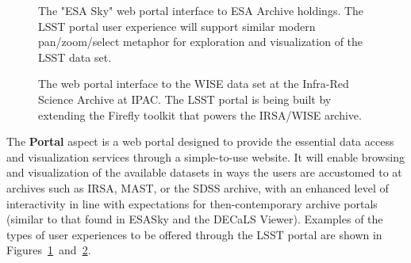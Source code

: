 \documentclass[DM,lsstdraft,toc]{lsstdoc}
\begin{document}
\begin{figure}
	\centering
	\caption{The "ESA Sky" web portal interface to ESA Archive holdings. The LSST portal user
		experience will support similar modern pan/zoom/select metaphor for exploration and visualization of the LSST data set.
		\label{fig:portalESA}}
\end{figure}

\begin{figure}
	\centering
	\caption{The web portal interface to the WISE data set at the Infra-Red Science Archive at IPAC. The LSST portal is being built by extending the Firefly toolkit that powers the IRSA/WISE archive.
		\label{fig:portalIRSA}}
\end{figure}

The {\bf Portal} aspect is a web portal designed to provide the essential data
access and visualization services through a simple-to-use website.  It will
enable browsing and visualization of the available datasets in ways the
users are accustomed to at archives such as IRSA, MAST, or the SDSS archive,
with an enhanced level of interactivity in line with expectations for
then-contemporary archive portals (similar to that found in ESASky and 
the DECaLS Viewer). Examples of the types of user experiences to be offered
through the LSST portal are shown in Figures~\ref{fig:portalESA}~and~\ref{fig:portalIRSA}.
\end{document}
